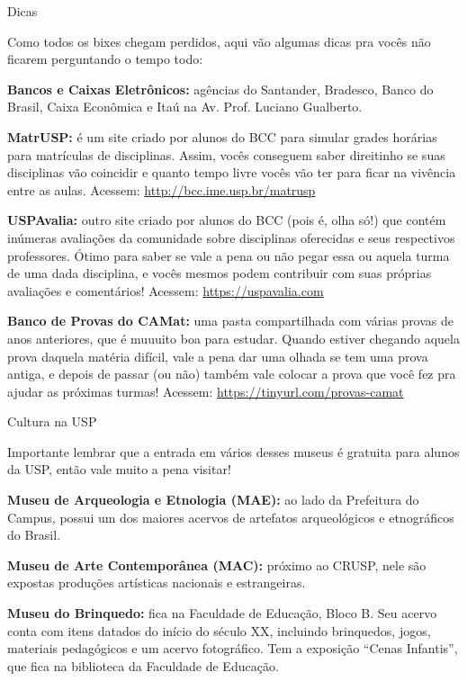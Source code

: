 \begin{secao}{Dicas}

Como todos os bixes chegam perdidos, aqui vão algumas dicas pra vocês não
ficarem perguntando o tempo todo:

{\bf Bancos e Caixas Eletrônicos:} agências do Santander, Bradesco,
Banco do Brasil, Caixa Econômica e Itaú na Av. Prof. Luciano Gualberto. 

{\bf MatrUSP:} é um site criado por alunos do BCC para simular grades horárias
para matrículas de disciplinas. Assim, vocês conseguem saber direitinho se suas
disciplinas vão coincidir e quanto tempo livre vocês vão ter para ficar na
vivência entre as aulas. Acessem: \url{http://bcc.ime.usp.br/matrusp}

{\bf USPAvalia:} outro site criado por alunos do BCC (pois é, olha só!) que
contém inúmeras avaliações da comunidade sobre disciplinas oferecidas e
seus respectivos professores. Ótimo para saber se vale a pena ou não pegar
essa ou aquela turma de uma dada disciplina, e vocês mesmos podem contribuir com
suas próprias avaliações e comentários! Acessem: \url{https://uspavalia.com}

{\bf Banco de Provas do CAMat:} uma pasta compartilhada com várias provas de
anos anteriores, que é muuuito boa para estudar. Quando estiver chegando aquela
prova daquela matéria difícil, vale a pena dar uma olhada se tem uma prova antiga,
e depois de passar (ou não) também vale colocar a prova que você fez pra ajudar
as próximas turmas! Acessem: \url{https://tinyurl.com/provas-camat}

\begin{subsecao}{Cultura na USP}

Importante lembrar que a entrada em vários desses museus é gratuita para alunos da
USP, então vale muito a pena visitar!

{\bf Museu de Arqueologia e Etnologia (MAE):} ao lado da Prefeitura do Campus,
possui um dos maiores acervos de artefatos arqueológicos e etnográficos do Brasil.

{\bf Museu de Arte Contemporânea (MAC):} próximo ao CRUSP, nele são expostas
produções artísticas nacionais e estrangeiras.

{\bf Museu do Brinquedo:} fica na Faculdade de Educação, Bloco B. Seu acervo conta 
com itens datados do início do século XX, incluindo brinquedos, jogos, materiais
pedagógicos e um acervo fotográfico. Tem a exposição ``Cenas Infantis'', que fica na
biblioteca da Faculdade de Educação.


\end{subsecao}
\end{secao}

